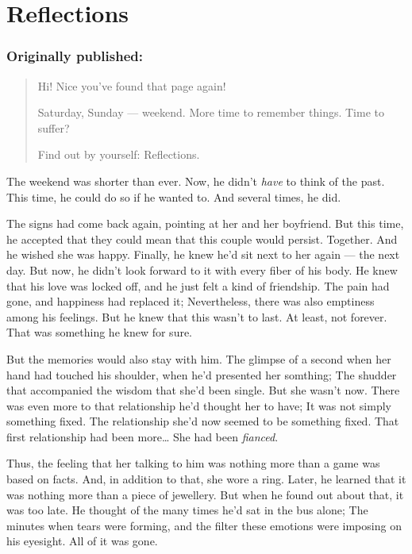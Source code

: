 \chapter{Reflections}
\label{cha:reflections}
\subsection*{Originally published: }
\begin{quote}
Hi! Nice you've found that page again!

Saturday, Sunday --- weekend. 
More time to remember things. 
Time to suffer?

Find out by yourself: Reflections.
\end{quote}

The weekend was shorter than ever. 
Now, he didn't \emph{have} to think of the past. 
This time, he could do so if he wanted to. 
And several times, he did.

The signs had come back again, pointing at her and her boyfriend. But this time, he accepted that they could mean that this couple would persist. Together. 
And he wished she was happy. 
Finally, he knew he'd sit next to her again --- the next day. 
But now, he didn't look forward to it with every fiber of his body. 
He knew that his love was locked off, and he just felt a kind of friendship. The pain had gone, and happiness had replaced it; Nevertheless, there was also emptiness among his feelings. 
But he knew that this wasn't to last. 
At least, not forever. 
That was something he knew for sure.

But the memories would also stay with him. 
The glimpse of a second when her hand had touched his shoulder, when he'd presented her somthing; The shudder that accompanied the wisdom that she'd been single. 
But she wasn't now. 
There was even more to that relationship he'd thought her to have; It was not simply something fixed. The relationship she'd now seemed to be something fixed. That first relationship had been more\ldots
She had been \emph{fianced}.

Thus, the feeling that her talking to him was nothing more than a game was based on facts. 
And, in addition to that, she wore a ring. 
Later, he learned that it was nothing more than a piece of jewellery. 
But when he found out about that, it was too late. 
He thought of the many times he'd sat in the bus alone; The minutes when tears were forming, and the filter these emotions were imposing on his eyesight. 
All of it was gone.

